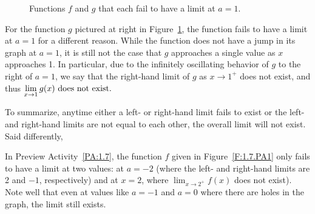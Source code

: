 \begin{figure}[h]
\begin{center}
\caption{Functions $f$ and $g$ that each fail to have a limit at $a = 1$.} \label{F:1.7.NoLimit}
\end{center}
\end{figure}

For the function $g$ pictured at right in Figure~\ref{F:1.7.NoLimit}, the function fails to have a limit at $a = 1$ for a different reason.  While the function does not have a jump in its graph at $a = 1$, it is still not the case that $g$ approaches a single value as $x$ approaches 1.  In particular, due to the infinitely oscillating behavior of $g$ to the right of $a = 1$, we say that the right-hand limit of $g$ as $x \to 1^+$ does not exist, and thus 
$\displaystyle \lim_{x \to 1} g(x) \ \mbox{does not exist}.$

To summarize, anytime either a left- or right-hand limit fails to exist or the left- and right-hand limits are not equal to each other, the overall limit will not exist.  Said differently, 

\vspace*{5pt}
\nin {}
\vspace*{1pt}

In Preview Activity~\ref{PA:1.7}, the function $f$ given in Figure~\ref{F:1.7.PA1} only fails to have a limit at two values:  at $a = -2$ (where the left- and right-hand limits are 2 and $-1$, respectively) and at $x = 2$, where $\lim_{x \to 2^+} f(x)$ does not exist).  Note well that even at values like $a = -1$ and $a = 0$ where there are holes in the graph, the limit still exists. 

